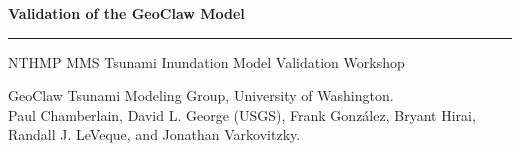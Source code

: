 

$~$
\vfil
\begin{center}
{{\Large\bf
Validation of the GeoClaw Model}\\
\vskip 15pt
\hrule
\vskip 15pt
{\large
NTHMP MMS Tsunami Inundation Model Validation Workshop}}
\vskip 30pt
GeoClaw Tsunami Modeling Group, University of Washington.\\
\vskip 10pt
\noindent
Paul Chamberlain,
David L. George (USGS),
Frank Gonz\'alez,
Bryant Hirai,
Randall J. LeVeque, and
Jonathan Varkovitzky.
\end{center}
\vfil
